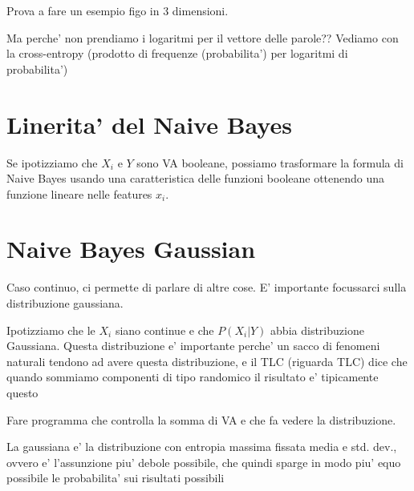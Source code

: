 Prova a fare un esempio figo in 3 dimensioni.

Ma perche' non prendiamo i logaritmi per il vettore delle parole?? Vediamo con la cross-entropy (prodotto di frequenze (probabilita') per logaritmi di probabilita')


\section{Linerita' del Naive Bayes}
Se ipotizziamo che $ X_i $ e $ Y $ sono VA booleane, possiamo trasformare la formula di Naive Bayes usando una caratteristica delle funzioni booleane ottenendo una funzione lineare nelle features $ x_i $.

\section{Naive Bayes Gaussian}
Caso continuo, ci permette di parlare di altre cose. E' importante focussarci sulla distribuzione gaussiana.

Ipotizziamo che le $ X_i $ siano continue e che $ P(X_i | Y) $ abbia distribuzione Gaussiana. Questa distribuzione e' importante perche' un sacco di fenomeni naturali tendono ad avere questa distribuzione, e il TLC (riguarda TLC) dice che quando sommiamo componenti di tipo randomico il risultato e' tipicamente questo

Fare programma che controlla la somma di VA e che fa vedere la distribuzione.

La gaussiana e' la distribuzione con entropia massima fissata media e std. dev., ovvero e' l'assunzione piu' debole possibile, che quindi sparge in modo piu' equo possibile le probabilita' sui risultati possibili

% 
